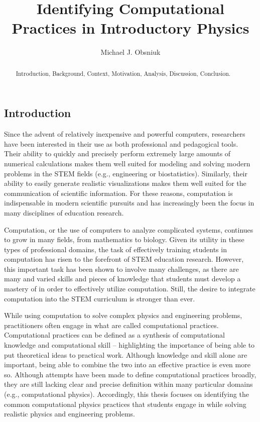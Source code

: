 \documentclass{msuphddissertation}
\author{Michael J. Obsniuk}
\title{Identifying Computational Practices in Introductory Physics}
\begin{document}
\maketitlepage

\begin{abstract}
Introduction, Background, Context, Motivation, Analysis, Discussion, Conclusion.
\end{abstract}

\TOC
\LOT
\LOF

\newpage
{}
\begin{doublespace}

%
%
%
%
%
%
%
%
%
%
%
%
%
%
%
%

\chapter{Introduction}\label{CH1:Introduction}

Since the advent of relatively inexpensive and powerful computers, researchers have been interested in their use as both professional and pedagogical tools.  Their ability to quickly and precisely perform extremely large amounts of numerical calculations makes them well suited for modeling and solving modern problems in the STEM fields (e.g., engineering or biostatistics).  Similarly, their ability to easily generate realistic visualizations makes them well suited for the communication of scientific information.  For these reasons, computation is indispensable in modern scientific pursuits and has increasingly been the focus in many disciplines of education research.

Computation, or the use of computers to analyze complicated systems, continues to grow in many fields, from mathematics to biology.  Given its utility in these types of professional domains, the task of effectively training students in computation has risen to the forefront of STEM education research.  However, this important task has been shown to involve many challenges, as there are many and varied skills and pieces of knowledge that students must develop a mastery of in order to effectively utilize computation.  Still, the desire to integrate computation into the STEM curriculum is stronger than ever.  %

While using computation to solve complex physics and engineering problems, practitioners often engage in what are called computational practices.  Computational practices can be defined as a synthesis of computational knowledge and computational skill -- highlighting the importance of being able to put theoretical ideas to practical work.  Although knowledge and skill alone are important, being able to combine the two into an effective practice is even more so.  Although attempts have been made to define computational practices broadly, they are still lacking clear and precise definition within many particular domains (e.g., computational physics).  Accordingly, this thesis focuses on identifying the common computational physics practices that students engage in while solving realistic physics and engineering problems.


\end{doublespace}
\end{document}
